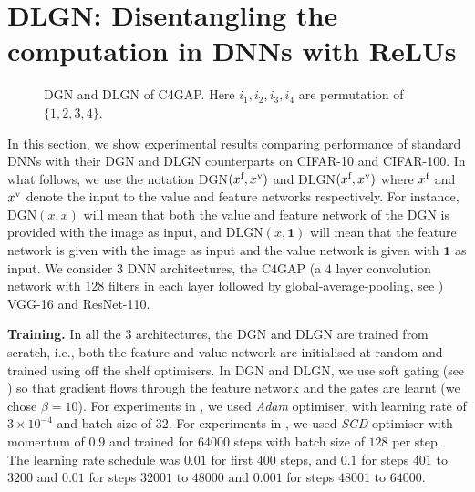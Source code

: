 \section{DLGN:  Disentangling the computation in DNNs with ReLUs}\label{sec:dlgn}
\begin{figure}[!b]
\centering
\begin{minipage}{0.40\columnwidth}
\centering
\resizebox{0.99\columnwidth}{!}{

}
\end{minipage}
\begin{minipage}{0.40\columnwidth}
\centering
\resizebox{0.99\columnwidth}{!}{

}
\end{minipage}
%
\caption{DGN and DLGN of C4GAP. Here $i_1,i_2,i_3,i_4$ are permutation of $\{1,2,3,4\}$.}
\label{fig:c4gap}
\end{figure}

In this section, we show experimental results comparing performance of standard DNNs with their DGN and DLGN counterparts on CIFAR-10 and CIFAR-100. In what follows, we use the notation DGN$(x^{\text{f}},x^{\text{v}})$ and DLGN$(x^{\text{f}},x^{\text{v}})$ where $x^{\text{f}}$ and $x^{\text{v}}$ denote the input to the value and feature networks respectively. For instance, DGN$(x,x)$ will mean that both the value and feature network of the DGN is provided with the image as input, and DLGN$(x,\mathbf{1})$ will mean that the feature network is given with the image as input and the value network is given with $\mathbf{1}$ as input. We consider $3$ DNN architectures, the C4GAP (a $4$ layer convolution network with $128$ filters in each layer followed by global-average-pooling, see ) VGG-16 and ResNet-110. %

\textbf{Training.} In all the $3$ architectures, the DGN and DLGN are trained from scratch, i.e., both the feature and value network are initialised at random and trained using off the shelf optimisers. In DGN and DLGN, we use soft gating (see ) so that gradient flows through the feature network and the gates are learnt (we chose $\beta=10$). For experiments in , we used \emph{Adam} optimiser, with learning rate of $3\times 10^{-4}$ and batch size of $32$. For  experiments in , we used  \emph{SGD} optimiser with momentum of $0.9$ and trained for $64000$ steps with batch size of $128$ per step. The learning rate schedule was $0.01$ for first $400$ steps, and $0.1$ for steps $401$ to $3200$ and $0.01$ for steps $32001$ to $48000$ and $0.001$ for steps $48001$ to $64000$.

